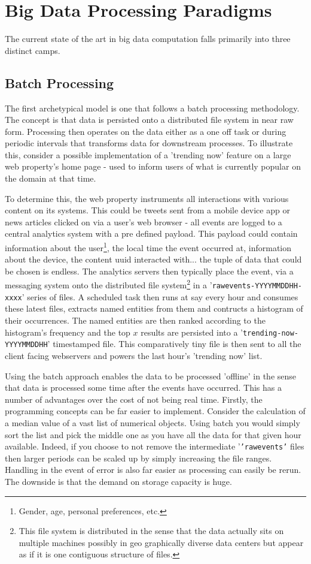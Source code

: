 \documentclass[a4paper,11pt]{scrreprt}
\begin{document}
\section{Big Data Processing Paradigms}
The current state of the art in big data computation falls primarily into three distinct camps.
\subsection{Batch Processing}
The first archetypical model is one that follows a batch processing methodology. The concept is that data is persisted onto a distributed file system in near raw form. Processing then operates on the data either as a one off task or during periodic intervals that transforms data for downstream processes. To illustrate this, consider a possible implementation of a 'trending now' feature on a large web property's home page - used to inform users of what is currently popular on the domain at that time. 

To determine this, the web property instruments all interactions with various content on its systems. This could be tweets sent from a mobile device app or news articles clicked on via a user's web browser - all events are logged to a central analytics system with a pre defined payload. This payload could contain information about the user\footnote{Gender, age, personal preferences, etc.}, the local time the event occurred at, information about the device, the content \acrshort{uuid} interacted with... the tuple of data that could be chosen is endless. The analytics servers then typically place the event, via a messaging system onto the distributed file system\footnote{This file system is distributed in the sense that the data actually sits on multiple machines possibly in geo graphically diverse data centers but appear as if it is one contiguous structure of files.} in a '\texttt{rawevents-YYYYMMDDHH-xxxx}' series of files. A scheduled task then runs at say every hour and consumes these latest files, extracts named entities from them and contructs a histogram of their occurrences. The named entities are then ranked according to the histogram's frequency and the top \(x\) results are persisted into a '\texttt{trending-now-YYYYMMDDHH}' timestamped file. This comparatively tiny file is then sent to all the client facing webservers and powers the last hour's 'trending now' list.

Using the batch approach enables the data to be processed 'offline' in the sense that data is processed some time after the events have occurred.  This has a number of advantages over the cost of not being real time. Firstly, the programming concepts can be far easier to implement. Consider the calculation of a median value of a vast list of numerical objects. Using batch you would simply sort the list and pick the middle one as you have all the data for that given hour available. Indeed, if you choose to not remove the intermediate '\texttt{'rawevents'} files then larger periods can be scaled up by simply increasing the file ranges. Handling in the event of error is also far easier as processing can easily be rerun. The downside is that the demand on storage capacity is huge.\\
\end{document}
